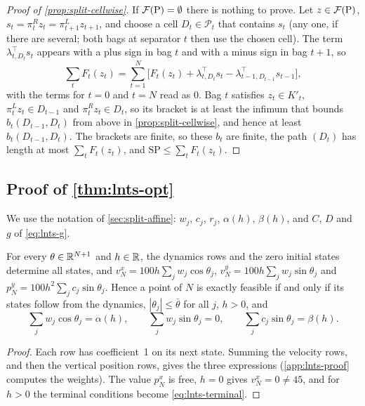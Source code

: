 \begin{proof}[Proof of \cref{prop:split-cellwise}]
If $\feas[\mathrm P]=\emptyset$ there is nothing to prove.
Let $z\in\feas[\mathrm P]$, $s_t=\pi^R_tz_t=\pi^L_{t+1}z_{t+1}$, and choose a
cell $D_t\in\mathcal P_t$ that contains $s_t$ (any one, if there are several;
both bags at separator $t$ then use the chosen cell).
The term $\lambda_{t,D_t}^\top s_t$ appears with a plus sign in bag $t$ and
with a minus sign in bag $t+1$, so
\[
  \sum_tF_t(z_t)=\sum_{t=1}^N\bigl[F_t(z_t)+\lambda_{t,D_t}^\top s_t
  -\lambda_{t-1,D_{t-1}}^\top s_{t-1}\bigr],
\]
with the terms for $t=0$ and $t=N$ read as $0$.
Bag $t$ satisfies $z_t\in K'_t$, $\pi^L_tz_t\in D_{t-1}$ and
$\pi^R_tz_t\in D_t$, so its bracket is at least the infimum that bounds
$b_t(D_{t-1},D_t)$ from above in \cref{prop:split-cellwise}, and hence at
least $b_t(D_{t-1},D_t)$.
The brackets are finite, so these $b_t$ are finite, the path $(D_t)$ has
length at most $\sum_tF_t(z_t)$, and $\mathrm{SP}\le\sum_tF_t(z_t)$.
\end{proof}

\subsection{Proof of \texorpdfstring{\cref{thm:lnts-opt}}{the lnts theorem}}\label{app:splitproofs-lnts}

We use the notation of \cref{sec:split-affine}: $w_j$, $c_j$, $r_j$, $\alpha(h)$, $\beta(h)$, and $C$, $D$ and $g$ of \eqref{eq:lnts-g}.

\begin{lemma}\label{lem:lnts-elim}
For every $\theta\in\R^{N+1}$ and $h\in\R$, the dynamics rows and the zero initial states determine all states, and $v^x_N=100h\sum_jw_j\cos\theta_j$, $v^y_N=100h\sum_jw_j\sin\theta_j$ and $p^y_N=100h^2\sum_jc_j\sin\theta_j$.
Hence a point of $N$ is exactly feasible if and only if its states follow from the dynamics, $|\theta_j|\le\bar\theta$ for all $j$, $h>0$, and
\begin{equation}\label{eq:lnts-terminal}
  \sum_jw_j\cos\theta_j=\alpha(h),\qquad \sum_jw_j\sin\theta_j=0,\qquad \sum_jc_j\sin\theta_j=\beta(h).
\end{equation}
\end{lemma}

\begin{proof}
Each row has coefficient~1 on its next state.
Summing the velocity rows, and then the vertical position rows, gives the three expressions (\cref{app:lnts-proof} computes the weights).
The value $p^x_N$ is free, $h=0$ gives $v^x_N=0\ne45$, and for $h>0$ the terminal conditions become \eqref{eq:lnts-terminal}.
\end{proof}

